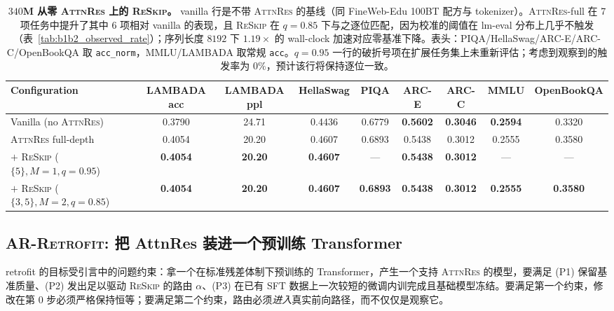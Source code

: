 \documentclass{article}
\newcommand{\attnres}{\textsc{AttnRes}}
\newcommand{\reskip}{\textsc{ReSkip}}
\newcommand{\retrofit}{\textsc{AR-Retrofit}}
\begin{document}
\begin{table}[t]
\caption{\textbf{$340$M 从零 \attnres{} 上的 \reskip{}。} vanilla 行是不带 \attnres{} 的基线（同 FineWeb-Edu 100BT 配方与 tokenizer）。\attnres{}-full 在 7 项任务中提升了其中 6 项相对 vanilla 的表现，且 \reskip{} 在 $q{=}0.85$ 下与之逐位匹配，因为校准的阈值在 lm-eval 分布上几乎不触发（表~\ref{tab:b1b2_observed_rate}）；序列长度 $8192$ 下 $1.19\times$ 的 wall-clock 加速对应零基准下降。表头：PIQA/HellaSwag/ARC-E/ARC-C/OpenBookQA 取 \texttt{acc\_norm}，MMLU/LAMBADA 取常规 \texttt{acc}。$q{=}0.95$ 一行的破折号项在扩展任务集上未重新评估；考虑到观察到的触发率为 $0\%$，预计该行将保持逐位一致。}
\label{tab:reskip_benchmark}
\centering\small
\setlength{\tabcolsep}{3.5pt}
\begin{tabular}{lcccccccc}
\toprule
Configuration & LAMBADA acc & LAMBADA ppl & HellaSwag & PIQA & ARC-E & ARC-C & MMLU & OpenBookQA \\
\midrule
Vanilla (no \attnres{})                    & 0.3790 & 24.71 & 0.4436 & 0.6779 & \textbf{0.5602} & \textbf{0.3046} & \textbf{0.2594} & 0.3320 \\
\midrule
\attnres{} full-depth                       & 0.4054 & 20.20 & 0.4607 & 0.6893 & 0.5438 & 0.3012 & 0.2555 & 0.3580 \\
$+$ \reskip{} ($\{5\}, M{=}1, q{=}0.95$)    & \textbf{0.4054} & \textbf{20.20} & \textbf{0.4607} & --- & \textbf{0.5438} & \textbf{0.3012} & --- & --- \\
$+$ \reskip{} ($\{3,5\}, M{=}2, q{=}0.85$)  & \textbf{0.4054} & \textbf{20.20} & \textbf{0.4607} & \textbf{0.6893} & \textbf{0.5438} & \textbf{0.3012} & \textbf{0.2555} & \textbf{0.3580} \\
\bottomrule
\end{tabular}
\end{table}

\subsection{\retrofit{}: 把 AttnRes 装进一个预训练 Transformer}
\label{sec:retrofit}

retrofit 的目标受引言中的问题约束：拿一个在标准残差体制下预训练的 Transformer，产生一个支持 \attnres{} 的模型，要满足 (P1) 保留基准质量、(P2) 发出足以驱动 \reskip{} 的路由 $\alpha$、(P3) 在已有 SFT 数据上一次较短的微调内训完成且基础模型冻结。要满足第一个约束，修改在第 $0$ 步必须严格保持恒等；要满足第二个约束，路由必须\emph{进入}真实前向路径，而不仅仅是观察它。
\end{document}
